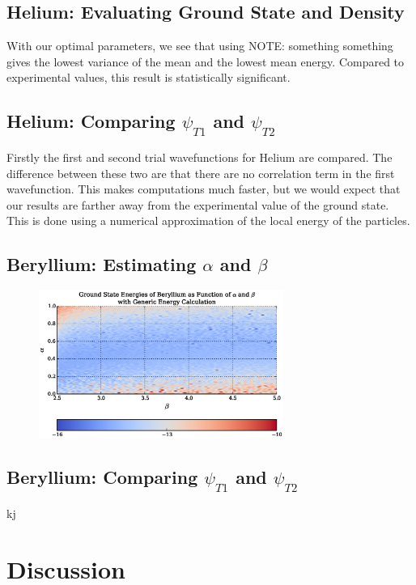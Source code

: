 \documentclass[twocolumn]{article}[10pt]
\begin{document}
\subsection{Helium: Evaluating Ground State and Density}
With our optimal parameters, we see that using NOTE: something something gives the
lowest variance of the mean and the lowest mean energy. 
Compared to experimental values, this result is statistically significant. 

\subsection{Helium: Comparing $\psi_{T1}$ and $\psi_{T2}$ }
Firstly the first and second trial wavefunctions for Helium are compared. 
The difference between these two are that there are no correlation term
in the first wavefunction. This makes computations much faster, but we
would expect that our results are farther away from the experimental 
value of the ground state. This is done using a numerical approximation 
of the local energy of the particles. 

\subsection{Beryllium: Estimating $\alpha$ and $\beta$}

\begin{figure}[h!]
	\centering
	\includegraphics[width=80mm]{../res/berylliumAlphaBeta/berylliumAlphaBeta.eps}
	\caption{}
\end{figure}


\subsection{Beryllium: Comparing $\psi_{T1}$ and $\psi_{T2}$}

kj


\section{Discussion}
\end{document}

